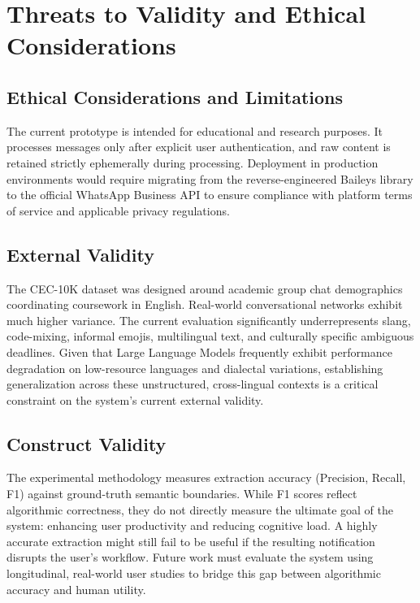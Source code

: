 \section{Threats to Validity and Ethical Considerations}
\label{sec:threats}

\subsection{Ethical Considerations and Limitations}
The current prototype is intended for educational and research purposes. It processes messages only after explicit user authentication, and raw content is retained strictly ephemerally during processing. Deployment in production environments would require migrating from the reverse-engineered Baileys library to the official WhatsApp Business API to ensure compliance with platform terms of service and applicable privacy regulations.

\subsection{External Validity}
The CEC-10K dataset was designed around academic group chat demographics coordinating coursework in English. Real-world conversational networks exhibit much higher variance. The current evaluation significantly underrepresents slang, code-mixing, informal emojis, multilingual text, and culturally specific ambiguous deadlines. Given that Large Language Models frequently exhibit performance degradation on low-resource languages and dialectal variations, establishing generalization across these unstructured, cross-lingual contexts is a critical constraint on the system's current external validity.

\subsection{Construct Validity}
The experimental methodology measures extraction accuracy (Precision, Recall, F1) against ground-truth semantic boundaries. While F1 scores reflect algorithmic correctness, they do not directly measure the ultimate goal of the system: enhancing user productivity and reducing cognitive load. A highly accurate extraction might still fail to be useful if the resulting notification disrupts the user's workflow. Future work must evaluate the system using longitudinal, real-world user studies to bridge this gap between algorithmic accuracy and human utility.

